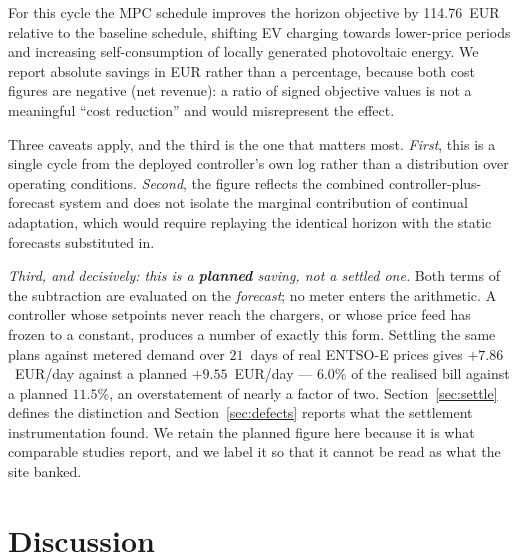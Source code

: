 \documentclass[journal]{IEEEtran}
\begin{document}
For this cycle the MPC schedule improves the horizon objective by
114.76~EUR relative to the baseline schedule, shifting EV charging
towards lower-price periods and increasing self-consumption of locally
generated photovoltaic energy. We report absolute savings in EUR rather
than a percentage, because both cost figures are negative (net revenue):
a ratio of signed objective values is not a meaningful ``cost
reduction'' and would misrepresent the effect.

Three caveats apply, and the third is the one that matters most.
\emph{First}, this is a single cycle from the deployed controller's own
log rather than a distribution over operating conditions. \emph{Second},
the figure reflects the combined controller-plus-forecast system and does
not isolate the marginal contribution of continual adaptation, which would
require replaying the identical horizon with the static forecasts
substituted in.

\emph{Third, and decisively: this is a \textbf{planned} saving, not a
settled one.} Both terms of the subtraction are evaluated on the
\emph{forecast}; no meter enters the arithmetic. A controller whose
setpoints never reach the chargers, or whose price feed has frozen to a
constant, produces a number of exactly this form. Settling the same plans
against metered demand over $21$~days of real ENTSO-E prices gives
$+7.86$~EUR/day against a planned $+9.55$~EUR/day --- $6.0\%$ of the
realised bill against a planned $11.5\%$, an overstatement of nearly a
factor of two. Section~\ref{sec:settle} defines the distinction and
Section~\ref{sec:defects} reports what the settlement instrumentation
found. We retain the planned figure here because it is what comparable
studies report, and we label it so that it cannot be read as what the site
banked.



























\section{Discussion}
\label{sec:discussion}
\end{document}

